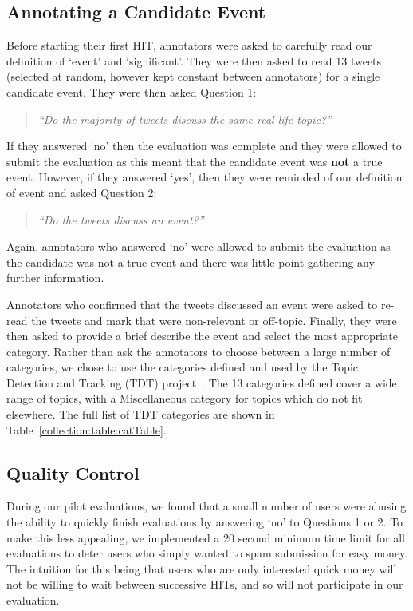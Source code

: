 \subsection{Annotating a Candidate Event}
\label{collection:sec:annotation}
Before starting their first HIT, annotators were asked to carefully read our definition of `event' and `significant'.
They were then asked to read 13 tweets (selected at random, however kept constant between annotators) for a single candidate event.
They were then asked Question 1:
\begin{quote}\emph{``Do the majority of tweets discuss the same real-life topic?''}
\end{quote}
If they answered `no' then the evaluation was complete and they were allowed to submit the evaluation as this meant that the candidate event was \textbf{not} a true event.
However, if they answered `yes', then they were reminded of our definition of event and asked Question 2:
\begin{quote}
\emph{``Do the tweets discuss an event?''}
\end{quote}
Again, annotators who answered `no' were allowed to submit the evaluation as the candidate was not a true event and there was little point gathering any further information.

Annotators who confirmed that the tweets discussed an event were asked to re-read the tweets and mark that were non-relevant or off-topic.
Finally, they were then asked to provide a brief describe the event and select the most appropriate category.
Rather than ask the annotators to choose between a large number of categories, we chose to use the categories defined and used by the Topic Detection and Tracking (TDT) project~\cite{Allan:2002:ITD:772260.772262}.
The 13 categories defined cover a wide range of topics, with a Miscellaneous category for topics which do not fit elsewhere.
The full list of TDT categories are shown in Table~\ref{collection:table:catTable}.

\subsection{Quality Control}
\label{sec:spam}
During our pilot evaluations, we found that a small number of users were abusing the ability to quickly finish evaluations by answering `no' to Questions 1 or 2.
To make this less appealing, we implemented a 20 second minimum time limit for all evaluations to deter users who simply wanted to spam submission for easy money.
The intuition for this being that users who are only interested quick money will not be willing to wait between successive HITs, and so will not participate in our evaluation.


